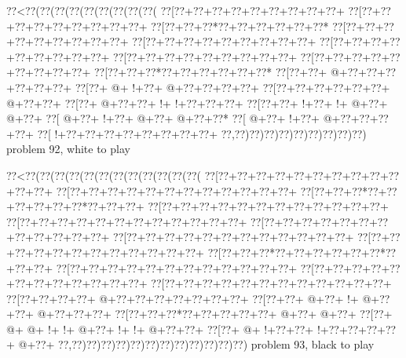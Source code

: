 \vbox{\vbox{\goo
\0??<\0??(\0??(\0??(\0??(\0??(\0??(\0??(\0??(\0??(
\0??[\0??+\0??+\0??+\0??+\0??+\0??+\0??+\0??+\0??+
\0??[\0??+\0??+\0??+\0??+\0??+\0??+\0??+\0??+\0??+
\0??[\0??+\0??+\0??*\0??+\0??+\0??+\0??+\0??+\0??*
\0??[\0??+\0??+\0??+\0??+\0??+\0??+\0??+\0??+\0??+
\0??[\0??+\0??+\0??+\0??+\0??+\0??+\0??+\0??+\0??+
\0??[\0??+\0??+\0??+\0??+\0??+\0??+\0??+\0??+\0??+
\0??[\0??+\0??+\0??+\0??+\0??+\0??+\0??+\0??+\0??+
\0??[\0??+\0??+\0??+\0??+\0??+\0??+\0??+\0??+\0??+
\0??[\0??+\0??+\0??*\0??+\0??+\0??+\0??+\0??+\0??*
\0??[\0??+\0??+\- @+\0??+\0??+\0??+\0??+\0??+\0??+
\0??[\0??+\- @+\- !+\0??+\- @+\0??+\0??+\0??+\0??+
\0??[\0??+\0??+\0??+\0??+\0??+\0??+\- @+\0??+\0??+
\0??[\0??+\- @+\0??+\0??+\- !+\- !+\0??+\0??+\0??+
\0??[\0??+\0??+\- !+\0??+\- !+\- @+\0??+\- @+\0??+
\0??[\- @+\0??+\- !+\0??+\- @+\0??+\- @+\0??+\0??*
\0??[\- @+\0??+\- !+\0??+\- @+\0??+\0??+\0??+\0??+
\0??[\- !+\0??+\0??+\0??+\0??+\0??+\0??+\0??+\0??+
\0??,\0??)\0??)\0??)\0??)\0??)\0??)\0??)\0??)\0??)
}
\hfil problem 92, white to play\hfil\break
}

\vbox{\vbox{\goo
\0??<\0??(\0??(\0??(\0??(\0??(\0??(\0??(\0??(\0??(\0??(\0??(\0??(
\0??[\0??+\0??+\0??+\0??+\0??+\0??+\0??+\0??+\0??+\0??+\0??+\0??+
\0??[\0??+\0??+\0??+\0??+\0??+\0??+\0??+\0??+\0??+\0??+\0??+\0??+
\0??[\0??+\0??+\0??*\0??+\0??+\0??+\0??+\0??+\0??*\0??+\0??+\0??+
\0??[\0??+\0??+\0??+\0??+\0??+\0??+\0??+\0??+\0??+\0??+\0??+\0??+
\0??[\0??+\0??+\0??+\0??+\0??+\0??+\0??+\0??+\0??+\0??+\0??+\0??+
\0??[\0??+\0??+\0??+\0??+\0??+\0??+\0??+\0??+\0??+\0??+\0??+\0??+
\0??[\0??+\0??+\0??+\0??+\0??+\0??+\0??+\0??+\0??+\0??+\0??+\0??+
\0??[\0??+\0??+\0??+\0??+\0??+\0??+\0??+\0??+\0??+\0??+\0??+\0??+
\0??[\0??+\0??+\0??*\0??+\0??+\0??+\0??+\0??+\0??*\0??+\0??+\0??+
\0??[\0??+\0??+\0??+\0??+\0??+\0??+\0??+\0??+\0??+\0??+\0??+\0??+
\0??[\0??+\0??+\0??+\0??+\0??+\0??+\0??+\0??+\0??+\0??+\0??+\0??+
\0??[\0??+\0??+\0??+\0??+\0??+\0??+\0??+\0??+\0??+\0??+\0??+\0??+
\0??[\0??+\0??+\0??+\0??+\- @+\0??+\0??+\0??+\0??+\0??+\0??+\0??+
\0??[\0??+\0??+\- @+\0??+\- !+\- @+\0??+\0??+\- @+\0??+\0??+\0??+
\0??[\0??+\0??+\0??*\0??+\0??+\0??+\0??+\0??+\- @+\0??+\- @+\0??+
\0??[\0??+\- @+\- @+\- !+\- !+\- @+\0??+\- !+\- !+\- @+\0??+\0??+
\0??[\0??+\- @+\- !+\0??+\0??+\- !+\0??+\0??+\0??+\0??+\- @+\0??+
\0??,\0??)\0??)\0??)\0??)\0??)\0??)\0??)\0??)\0??)\0??)\0??)\0??)
}
\hfil problem 93, black to play\hfil\break
}

